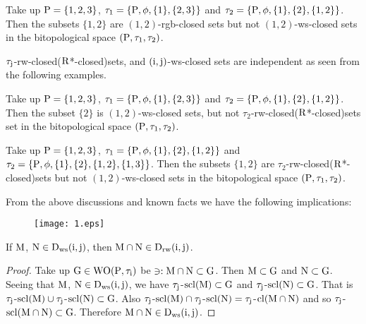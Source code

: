 \begin{exm}\label{exm8.2.9}
Take up $\mathrm{P}=\{1,2,3\}$, $\tau_1 =\{\mathrm{P}, \phi, \{1\}, \{ 2,3\}\}$ and $\tau_2 =\{\TSP, \phi, \{1\},\break \{2\},\{1,2\}\}$. Then the subsets $\{1, 2\}$ are $(1, 2)$-rgb-closed sets but not $(1, 2)$-ws-closed sets in the bitopological space $(\mathrm{P}, \tau_1, \tau_2 )$.
\end{exm}

\begin{rem}\label{rem8.2.2}
$\tau_{\mathrm{j}}$-rw-closed($\mathrm{R}$*-closed)sets, and $(\mathrm{i},\mathrm{j})$-ws-closed sets are independent as seen from the following examples.
\end{rem}

\begin{exm}\label{exm8.2.10}
Take up $\mathrm{P}= \{1,2,3\}$, $\tau_1 =\{\mathrm{P}, \phi, \{1\}, \{2,3\}\}$ and $\tau_2 =\{\TSP, \phi, \{1\},\break \{2\},\{1, 2\}\}$. Then the subset $\{2\}$ is $(1, 2)$-ws-closed sets, but not $\tau_2$-rw-closed($\mathrm{R}$*-closed)sets set in the bitopological space $(\mathrm{P}, \tau_1, \tau_2 )$.
\end{exm}

\begin{exm}\label{exm8.2.11}
Take up $\mathrm{P}=\{1,2,3\}$, $\tau_1 =\{\mathrm{P}, \phi, \{1\}, \{2\}, \{1, 2\}\}$ and $\tau_2 =\{\mathrm{P}, \phi, \{1\},\{2\},\{1,2\},\{1, 3\}\}$. Then the subsets $\{1,2\}$ are $\tau_2$-rw-closed($\mathrm{R}$*-closed)sets but not $(1, 2)$-ws-closed sets in the bitopological space $(\mathrm{P}, \tau_1, \tau_2 )$.
\end{exm}

\begin{rem}\label{rem8.2.3}
From the above discussions and known facts we have the following implications:
\begin{figure}[H]
\centering
\texttt{[image: 1.eps]}
\end{figure}
\end{rem}

\begin{thm}\label{thm8.2.10}
If $\mathrm{M}$, $\mathrm{N}\in \mathrm{D}_{\mathrm{ws}} (\mathrm{i}, \mathrm{j})$, then $\mathrm{M}\cap \mathrm{N}\in \mathrm{D}_{\mathrm{rw}} (\mathrm{i}, \mathrm{j})$.
\end{thm}

\begin{proof}
Take up $\mathrm{G}\in \mathrm{W}\mathrm{O}(\mathrm{P}, \tau_{\mathrm{i}})$ be $\ni: \mathrm{M}\cap \mathrm{N} \subset \mathrm{G}$. Then $\mathrm{M} \subset \mathrm{G}$ and $\mathrm{N} \subset \mathrm{G}$. Seeing that $\mathrm{M}$, $\mathrm{N}\in \mathrm{D}_{\mathrm{ws}} (\mathrm{i}, \mathrm{j})$, we have $\tau_{\mathrm{j}}$-$\mathrm{scl}(\mathrm{M}) \subset \mathrm{G}$ and $\tau_{\mathrm{j}}$-$\mathrm{scl}(\mathrm{N}) \subset \mathrm{G}$. That is $\tau_{\mathrm{j}}$-$\mathrm{scl}(\mathrm{M}) \cup \tau_{\mathrm{j}}$-$\mathrm{scl}(\mathrm{N}) \subset \mathrm{G}$. Also $\tau_{\mathrm{j}}$-$\mathrm{scl}(\mathrm{M}) \cap  \tau_{\mathrm{j}}$-$\mathrm{scl}(\mathrm{N})= \tau_{\mathrm{j}}$-$\mathrm{cl}(\mathrm{M}\cap \mathrm{N})$ and so $\tau_{\mathrm{j}}$-$\mathrm{scl}(\mathrm{M}\cap \mathrm{N}) \subset \mathrm{G}$. Therefore $\mathrm{M}\cap \mathrm{N}\in \mathrm{D}_{\mathrm{ws}} (\mathrm{i}, \mathrm{j})$.
\end{proof}

